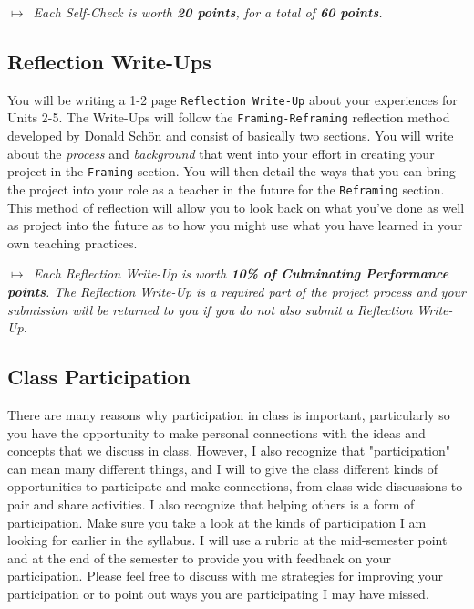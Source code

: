 \documentclass{tufte-handout}
\begin{document}
\medskip\noindent\textit{$\mapsto$~Each Self-Check is worth \textbf{20 points}, for a total of \textbf{60 points}.}

\subsection{Reflection Write-Ups}

You will be writing a 1-2 page \texttt{Reflection Write-Up} about your experiences for Units 2-5. The Write-Ups will follow the  \texttt{Framing-Reframing} reflection method developed by Donald Sch\"{o}n and consist of basically two sections. You will write about the \textit{process} and \textit{background} that went into your effort in creating your project in the \texttt{Framing} section. You will then detail the ways that you can bring the project into your role as a teacher in the future for the \texttt{Reframing} section. This method of reflection will allow you to look back on what you've done as well as project into the future as to how you might use what you have learned in your own teaching practices.

\medskip\noindent\textit{$\mapsto$~Each Reflection Write-Up is worth \textbf{10\% of Culminating Performance points}. The Reflection Write-Up is a required part of the project process and your submission will be returned to you if you do not also submit a Reflection Write-Up.}

\subsection{Class Participation}
There are many reasons why participation in class is important, particularly so you have the opportunity to make personal connections with the ideas and concepts that we discuss in class. However, I also recognize that "participation" can mean many different things, and I will to give the class different kinds of opportunities to participate and make connections, from class-wide discussions to pair and share activities. I also recognize that helping others is a form of participation. Make sure you take a look at the kinds of participation I am looking for earlier in the syllabus. I will use a rubric at the mid-semester point and at the end of the semester to provide you with feedback on your participation. Please feel free to discuss with me strategies for improving your participation or to point out ways you are participating I may have missed.
\end{document}
